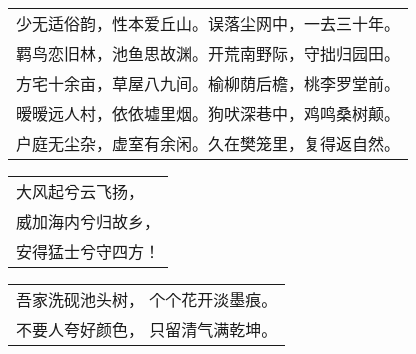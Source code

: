 \nopagebreak%
\nopagebreak%
\noindent\begin{minipage}{\linewidth}
  \vskip-3pt\begin{table}[H]
    \centering
    \begin{tabular}{@{}l@{}}
少无适俗韵，性本爱丘山。误落尘网中，一去三十年。\\
羁鸟恋旧林，池鱼思故渊。开荒南野际，守拙归园田。\\
方宅十余亩，草屋八九间。榆柳荫后檐，桃李罗堂前。\\
暧暧远人村，依依墟里烟。狗吠深巷中，鸡鸣桑树颠。\\
户庭无尘杂，虚室有余闲。久在樊笼里，复得返自然。
    \end{tabular}
  \end{table}
\end{minipage}
\vspace{1cm}


\nopagebreak%
\nopagebreak%
\noindent\begin{minipage}{\linewidth}
  \vskip-3pt\begin{table}[H]
    \centering
    \begin{tabular}{@{}l@{}}
大风起兮云飞扬，\\
威加海内兮归故乡，\\
安得猛士兮守四方！
    \end{tabular}
  \end{table}
\end{minipage}
\vspace{1cm}


\nopagebreak%
\nopagebreak%
\noindent\begin{minipage}{\linewidth}
  \vskip-3pt\begin{table}[H]
    \centering
    \begin{tabular}{@{}l@{}}
吾家洗砚池头树， 个个花开淡墨痕。\\
不要人夸好颜色， 只留清气满乾坤。
    \end{tabular}
  \end{table}
\end{minipage}
\vspace{1cm}


